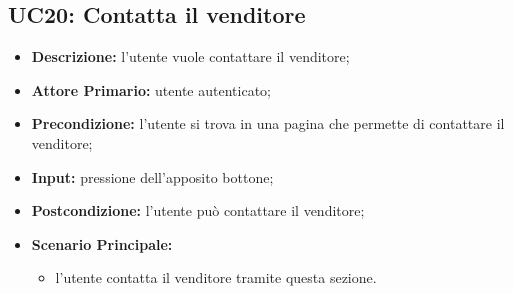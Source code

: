 \subsection{UC20: Contatta il venditore}
\label{sec:UC20}
\begin{itemize}
    \item \textbf{Descrizione:} l'utente vuole contattare il venditore;
    \item \textbf{Attore Primario:} utente autenticato;
    \item \textbf{Precondizione:} l'utente si trova in una pagina che permette di contattare il venditore;
    \item \textbf{Input:} pressione dell'apposito bottone;
    \item \textbf{Postcondizione:} l'utente può contattare il venditore;
    \item \textbf{Scenario Principale:}
          \begin{itemize}
              \item l'utente contatta il venditore tramite questa sezione.
          \end{itemize}
\end{itemize}